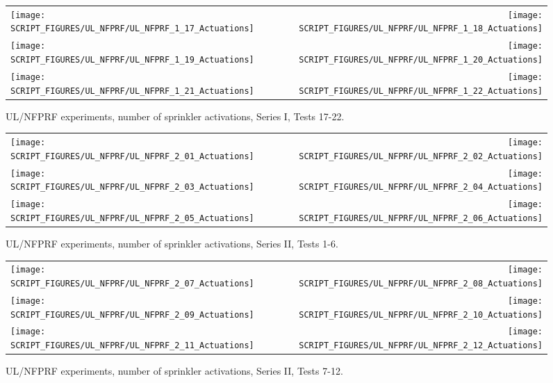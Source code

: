 \begin{figure}[p]
\begin{tabular*}{\textwidth}{l@{\extracolsep{\fill}}r}
\texttt{[image: SCRIPT\_FIGURES/UL\_NFPRF/UL\_NFPRF\_1\_17\_Actuations]} &
\texttt{[image: SCRIPT\_FIGURES/UL\_NFPRF/UL\_NFPRF\_1\_18\_Actuations]} \\
\texttt{[image: SCRIPT\_FIGURES/UL\_NFPRF/UL\_NFPRF\_1\_19\_Actuations]} &
\texttt{[image: SCRIPT\_FIGURES/UL\_NFPRF/UL\_NFPRF\_1\_20\_Actuations]} \\
\texttt{[image: SCRIPT\_FIGURES/UL\_NFPRF/UL\_NFPRF\_1\_21\_Actuations]} &
\texttt{[image: SCRIPT\_FIGURES/UL\_NFPRF/UL\_NFPRF\_1\_22\_Actuations]}
\end{tabular*}
\caption{UL/NFPRF experiments, number of sprinkler activations, Series I, Tests 17-22.}
\label{UL_NFPRF_3}
\end{figure}

\begin{figure}[p]
\begin{tabular*}{\textwidth}{l@{\extracolsep{\fill}}r}
\texttt{[image: SCRIPT\_FIGURES/UL\_NFPRF/UL\_NFPRF\_2\_01\_Actuations]} &
\texttt{[image: SCRIPT\_FIGURES/UL\_NFPRF/UL\_NFPRF\_2\_02\_Actuations]} \\
\texttt{[image: SCRIPT\_FIGURES/UL\_NFPRF/UL\_NFPRF\_2\_03\_Actuations]} &
\texttt{[image: SCRIPT\_FIGURES/UL\_NFPRF/UL\_NFPRF\_2\_04\_Actuations]} \\
\texttt{[image: SCRIPT\_FIGURES/UL\_NFPRF/UL\_NFPRF\_2\_05\_Actuations]} &
\texttt{[image: SCRIPT\_FIGURES/UL\_NFPRF/UL\_NFPRF\_2\_06\_Actuations]}
\end{tabular*}
\caption{UL/NFPRF experiments, number of sprinkler activations, Series II, Tests 1-6.}
\label{UL_NFPRF_2_1}
\end{figure}

\begin{figure}[p]
\begin{tabular*}{\textwidth}{l@{\extracolsep{\fill}}r}
\texttt{[image: SCRIPT\_FIGURES/UL\_NFPRF/UL\_NFPRF\_2\_07\_Actuations]} &
\texttt{[image: SCRIPT\_FIGURES/UL\_NFPRF/UL\_NFPRF\_2\_08\_Actuations]} \\
\texttt{[image: SCRIPT\_FIGURES/UL\_NFPRF/UL\_NFPRF\_2\_09\_Actuations]} &
\texttt{[image: SCRIPT\_FIGURES/UL\_NFPRF/UL\_NFPRF\_2\_10\_Actuations]} \\
\texttt{[image: SCRIPT\_FIGURES/UL\_NFPRF/UL\_NFPRF\_2\_11\_Actuations]} &
\texttt{[image: SCRIPT\_FIGURES/UL\_NFPRF/UL\_NFPRF\_2\_12\_Actuations]}
\end{tabular*}
\caption{UL/NFPRF experiments, number of sprinkler activations, Series II, Tests 7-12.}
\label{UL_NFPRF_2_2}
\end{figure}

